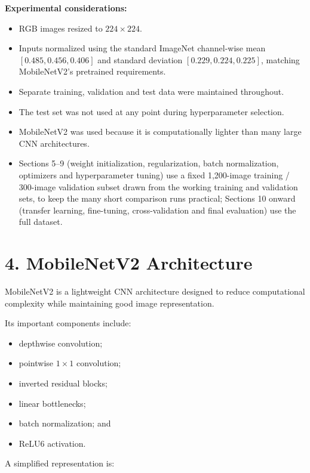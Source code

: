 \documentclass[10pt]{article}
\begin{document}
\textbf{Experimental considerations:}

\begin{itemize}
\item RGB images resized to $224\times224$.
\item Inputs normalized using the standard ImageNet channel-wise mean
$[0.485, 0.456, 0.406]$ and standard deviation $[0.229, 0.224, 0.225]$,
matching MobileNetV2's pretrained requirements.
\item Separate training, validation and test data were maintained throughout.
\item The test set was not used at any point during hyperparameter selection.
\item MobileNetV2 was used because it is computationally lighter than many
large CNN architectures.
\item Sections 5--9 (weight initialization, regularization, batch
normalization, optimizers and hyperparameter tuning) use a fixed
1{,}200-image training / 300-image validation subset drawn from the working
training and validation sets, to keep the many short comparison runs
practical; Sections 10 onward (transfer learning, fine-tuning,
cross-validation and final evaluation) use the full dataset.
\end{itemize}

\section*{4. MobileNetV2 Architecture}

MobileNetV2 is a lightweight CNN architecture designed to reduce
computational complexity while maintaining good image representation.

Its important components include:

\begin{itemize}
\item depthwise convolution;
\item pointwise $1\times1$ convolution;
\item inverted residual blocks;
\item linear bottlenecks;
\item batch normalization; and
\item ReLU6 activation.
\end{itemize}

A simplified representation is:
\end{document}
